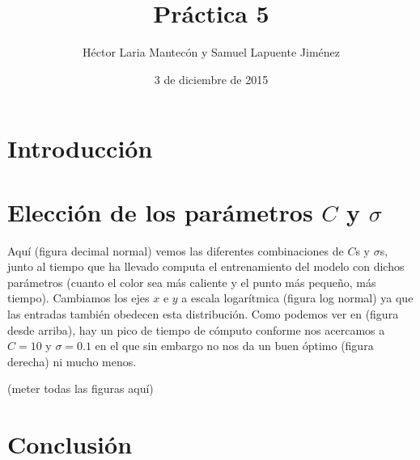 \documentclass{article}
\title{Práctica 5}
\author{Héctor Laria Mantecón y Samuel Lapuente Jiménez}
\date{3 de diciembre de 2015}
\begin{document}
\maketitle

\section{Introducción}

\section{Elección de los parámetros $C$ y $\sigma$}
Aquí (figura decimal normal) vemos las diferentes combinaciones de $C$s y $\sigma$s, junto al tiempo que ha llevado computa el entrenamiento del modelo con dichos parámetros (cuanto el color sea más caliente y el punto más pequeño, más tiempo).
Cambiamos los ejes $x$ e $y$ a escala logarítmica (figura log normal) ya que las entradas también obedecen esta distribución.
Como podemos ver en (figura desde arriba), hay un pico de tiempo de cómputo conforme nos acercamos a $C = 10$ y $\sigma = 0.1$ en el que sin embargo no nos da un buen óptimo (figura derecha) ni mucho menos.

(meter todas las figuras aquí)

\section{Conclusión}
\end{document}
